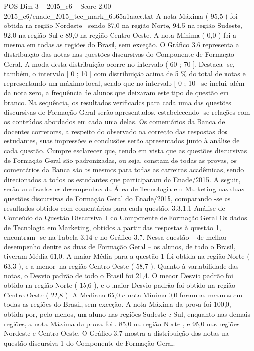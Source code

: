 \begin{textsample}{POS Dim 3 – 2015\_c6 – Score 2.00 – 2015\_c6/enade\_2015\_tec\_mark\_6b65a1aace.txt}
A nota Máxima ( 95,5 ) foi obtida na região Nordeste ; sendo 87,0 na região Norte, 94,5 na região Sudeste, 92,0 na região Sul e 89,0 na região Centro-Oeste.
A nota Mínima ( 0,0 ) foi a mesma em todas as regiões do Brasil, sem exceção.
O Gráfico 3.6 representa a distribuição das notas nas questões discursivas do Componente de Formação Geral.
A moda desta distribuição ocorre no intervalo ( 60 ; 70 ].
Destaca -se, também, o intervalo [ 0 ; 10 ] com distribuição acima de 5 \% do total de notas e representando um máximo local, sendo que no intervalo [ 0 ; 10 ] se inclui, além da nota zero, a frequência de alunos que deixaram este tipo de questão em branco.
Na sequência, os resultados verificados para cada uma das questões discursivas de Formação Geral serão apresentados, estabelecendo -se relações com os conteúdos abordados em cada uma delas.
Os comentários da Banca de docentes corretores, a respeito do observado na correção das respostas dos estudantes, suas impressões e conclusões serão apresentados junto à análise de cada questão.
Cumpre esclarecer que, tendo em vista que as questões discursivas de Formação Geral são padronizadas, ou seja, constam de todas as provas, os comentários da Banca são os mesmos para todas as carreiras acadêmicas, sendo direcionados a todos os estudantes que participaram do Enade/2015.
A seguir, serão analisados os desempenhos da Área de Tecnologia em Marketing nas duas questões discursivas de Formação Geral do Enade/2015, comparando -se os resultados obtidos com comentários para cada questão. 3.3.1.1 Análise de Conteúdo da Questão Discursiva 1 do Componente de Formação Geral Os dados de Tecnologia em Marketing, obtidos a partir das respostas à questão 1, encontram -se na Tabela 3.14 e no Gráfico 3.7.
Nessa questão – de melhor desempenho dentre as duas de Formação Geral – os alunos, de todo o Brasil, tiveram Média 61,0.
A maior Média para a questão 1 foi obtida na região Norte ( 63,3 ), e a menor, na região Centro-Oeste ( 58,7 ).
Quanto à variabilidade das notas, o Desvio padrão de todo o Brasil foi 21,4.
O menor Desvio padrão foi obtido na região Norte ( 15,6 ), e o maior Desvio padrão foi obtido na região Centro-Oeste ( 22,8 ).
A Mediana 65,0 e nota Mínima 0,0 foram as mesmas em todas as regiões do Brasil, sem exceção.
A nota Máxima da prova foi 100,0, obtida por, pelo menos, um aluno nas regiões Sudeste e Sul, enquanto nas demais regiões, a nota Máxima da prova foi : 85,0 na região Norte ; e 95,0 nas regiões Nordeste e Centro-Oeste.
O Gráfico 3.7 mostra a distribuição das notas na questão discursiva 1 do Componente de Formação Geral.

\end{textsample}

